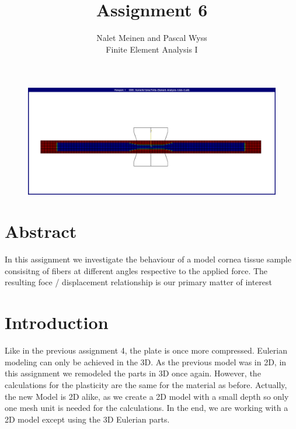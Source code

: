\documentclass[12pt]{article}
\begin{document}


\title{Assignment 6}%
\author{Nalet Meinen and Pascal Wyss\\ %
Finite Element Analysis I
}
\maketitle

\begin{figure}[!htb]
  \centering
  \vspace*{1cm}
  \includegraphics[trim={2cm 2cm 2cm 2cm},clip,width=1.0\linewidth]{pics/titelbild}
  \label{fig:0}
\end{figure}

\newpage

\section*{Abstract}
In this assignment we investigate the behaviour of a model cornea tissue sample consisitng of fibers at different angles
respective to the applied force. The resulting foce / displacement relationship is our primary
matter of interest


\tableofcontents
\pagebreak
\section{Introduction}
Like in the previous assignment 4, the plate is once more compressed. Eulerian modeling can only be achieved in the 3D. As the previous model was in 2D, in this assignment we remodeled the parts in 3D once again. However, the calculations for the plasticity are the same for the material as before. Actually, the new Model is 2D alike, as we create a 2D model with a small depth so only one mesh unit is needed for the calculations. In the end, we are working with a 2D model except using the 3D Eulerian parts. 
\end{document}
